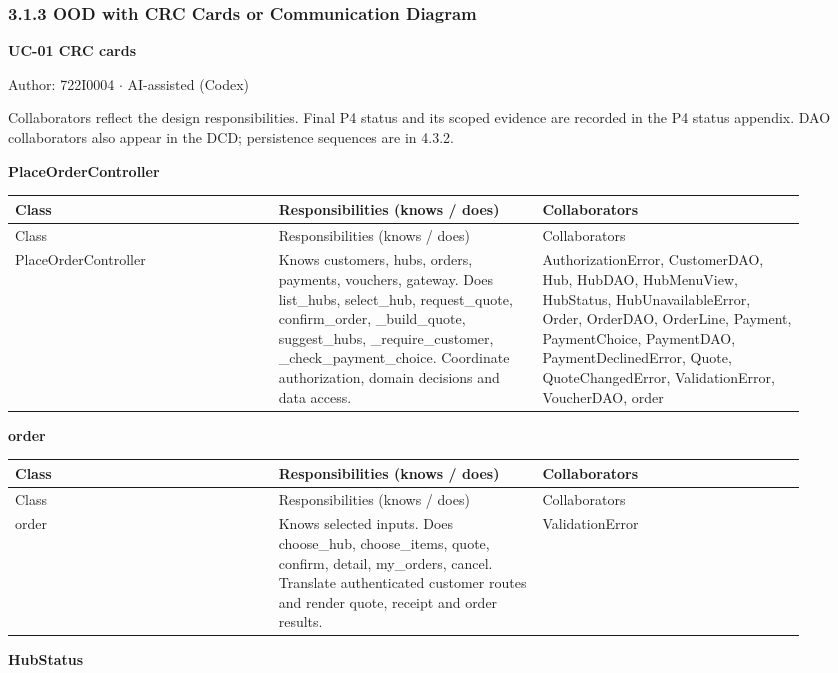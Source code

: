 \subsubsection*{3.1.3 OOD with CRC Cards or Communication Diagram}
\label{CRC-UC-01}
\textbf{UC-01 CRC cards}

Author: 722I0004 \ensuremath{\cdot} AI-assisted (Codex)

Collaborators reflect the design responsibilities. Final P4 status and its scoped evidence are recorded in the P4 status appendix. DAO collaborators also appear in the DCD; persistence sequences are in 4.3.2.

\textbf{PlaceOrderController}

\begin{longtable}{>{\raggedright\arraybackslash}p{0.3067\linewidth}>{\raggedright\arraybackslash}p{0.3067\linewidth}>{\raggedright\arraybackslash}p{0.3067\linewidth}}
Class & Responsibilities (knows / does) & Collaborators \\
\hline\endfirsthead
Class & Responsibilities (knows / does) & Collaborators \\
\hline\endhead
PlaceOrderController & Knows customers, hubs, orders, payments, vouchers, gateway. Does list\_hubs, select\_hub, request\_quote, confirm\_order, \_build\_quote, suggest\_hubs, \_require\_customer, \_check\_payment\_choice. Coordinate authorization, domain decisions and data access. & AuthorizationError, CustomerDAO, Hub, HubDAO, HubMenuView, HubStatus, HubUnavailableError, Order, OrderDAO, OrderLine, Payment, PaymentChoice, PaymentDAO, PaymentDeclinedError, Quote, QuoteChangedError, ValidationError, VoucherDAO, order \\
\end{longtable}
\textbf{order}

\begin{longtable}{>{\raggedright\arraybackslash}p{0.3067\linewidth}>{\raggedright\arraybackslash}p{0.3067\linewidth}>{\raggedright\arraybackslash}p{0.3067\linewidth}}
Class & Responsibilities (knows / does) & Collaborators \\
\hline\endfirsthead
Class & Responsibilities (knows / does) & Collaborators \\
\hline\endhead
order & Knows selected inputs. Does choose\_hub, choose\_items, quote, confirm, detail, my\_orders, cancel. Translate authenticated customer routes and render quote, receipt and order results. & ValidationError \\
\end{longtable}
\textbf{HubStatus}

